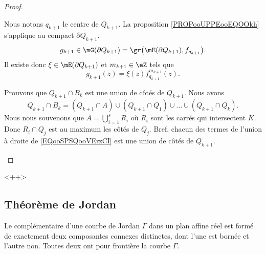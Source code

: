 \begin{proof}
\begin{subproof}
        Nous notons \( q_{k+1}\) le centre de \( Q_{k+1}\). La proposition \ref{PROPooUPPEooEQOOkh} s'applique au compact \( \partial Q_{k+1}\).
        \begin{equation}
            g_{k+1}\in\mG(\partial Q_{k+1})=\gr\big( \mE(\partial Q_{k+1}), f_{q_{k+1}}  \big).
        \end{equation}
        Il existe donc \( \xi\in\mE(\partial Q_{k+1})\) et \( m_{k+1}\in \eZ\) tels que 
        \begin{equation}
            g_{k+1}(z)=\xi(z)f_{q_{k+1}}^{m_{k+1}}(z).
        \end{equation}

        Prouvons que \( Q_{k+1}\cap B_k\) est une union de côtés de \( Q_{k+1}\). Nous avons
        \begin{equation}        \label{EQooSPSQooVErzCI}
            Q_{k+1}\cap B_k=(Q_{k+1}\cap A)\cup(Q_{k+1}\cap Q_1)\cup\ldots\cup(Q_{k+1}\cap Q_k).
        \end{equation}
        Nous nous souvenons que \( A=\bigcup_{i=1}^sR_i\) où \( R_i\) sont les carrés qui intersectent \( K\). Donc \( R_i\cap Q_j\) est au maximum les côtés de \( Q_j\). Bref, chacun des termes de l'union à droite de \eqref{EQooSPSQooVErzCI} est une union de côtés de \( Q_{k+1}\).

        
    \end{subproof}
    
\end{proof}
<++>

\subsection{Théorème de Jordan}

\begin{theorem}\label{ThoHSPWBuh}
	Le complémentaire d'une courbe de Jordan \( \Gamma\) dans un plan affine réel est formé de exactement deux composantes connexes distinctes, dont l'une est bornée et l'autre non. Toutes deux ont pour frontière la courbe \( \Gamma\).
\end{theorem}
